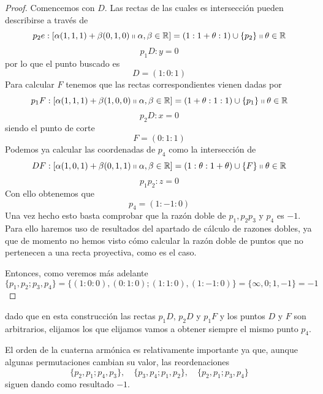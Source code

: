 \begin{proof}
	Comencemos con $D$. Las rectas de las cuales es intersección pueden describirse a través de 
	\begin{equation*}
		p_2e:\left [ \alpha(1,1,1)+\beta(0,1,0)\shortparallel\alpha,\beta\in \mathbb{R} \right ]=(1:1+\theta:1)\cup\{p_2\}\shortparallel\theta\in\mathbb{R}
	\end{equation*}
	\begin{equation*}
		p_1D:y=0
	\end{equation*}
	por lo que el punto buscado es
	\[D=(1:0:1)\]
	Para calcular $F$ tenemos que las rectas correspondientes vienen dadas por
	\begin{equation*}
		p_1F:\left [ \alpha(1,1,1)+\beta(1,0,0)\shortparallel\alpha,\beta\in \mathbb{R} \right ]=(1+\theta:1:1)\cup\{p_1\}\shortparallel\theta\in\mathbb{R}
	\end{equation*}
	\begin{equation*}
		p_2D:x=0
	\end{equation*}
	siendo el punto de corte
	\[F=(0:1:1)\]
	Podemos ya calcular las coordenadas de $p_4$ como la intersección de 
	\begin{equation*}
		DF:\left [ \alpha(1,0,1)+\beta(0,1,1)\shortparallel\alpha,\beta\in \mathbb{R} \right ]=(1:\theta:1+\theta)\cup\{F\}\shortparallel\theta\in\mathbb{R}
	\end{equation*}
	\begin{equation*}
		p_1p_2:z=0
	\end{equation*}
	Con ello obtenemos que
	\[p_4=(1:-1:0)\]
	Una vez hecho esto basta comprobar que la razón doble de $p_1,p_2p_3$ y $p_4$ es $-1$. Para ello haremos uso de resultados del apartado de cálculo de razones dobles, ya que de momento no hemos visto cómo calcular la razón doble de puntos que no pertenecen a una recta proyectiva, como es el caso.
	
	Entonces, como veremos más adelante
	\begin{equation}
		\{p_1,p_2;p_3,p_4\}=\{(1:0:0),(0:1:0);(1:1:0),(1:-1:0)\}=\{\infty,0;1,-1\}=-1
	\end{equation}
\end{proof}
dado que en esta construcción las rectas $p_1D$, $p_2D$ y $p_1F$ y los puntos $D$ y $F$ son arbitrarios, elijamos los que elijamos vamos a obtener siempre el mismo punto $p_4$. 

El orden de la cuaterna armónica es relativamente importante ya que, aunque algunas permutaciones cambian su valor, las reordenaciones
\begin{equation*}
	\{p_2,p_1;p_4,p_3\}, \quad \{p_3,p_4;p_1,p_2\}, \quad \{p_2,p_1;p_3,p_4\}
\end{equation*}
siguen dando como resultado $-1$.

